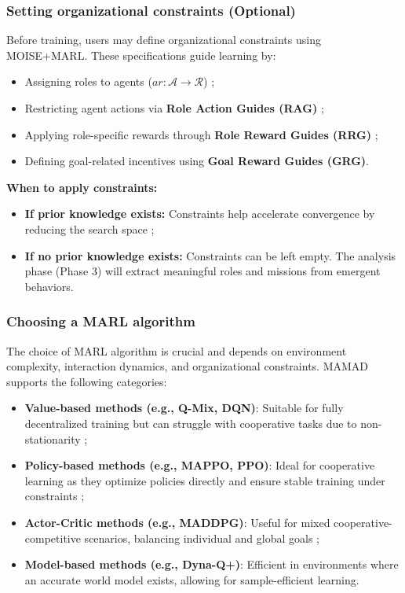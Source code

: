 \documentclass[pdflatex,sn-mathphys-num]{sn-jnl}%
\theoremstyle{thmstyleone}%
\theoremstyle{thmstyletwo}%
\theoremstyle{thmstylethree}%
\begin{document}
\subsubsection{Setting organizational constraints (Optional)}
Before training, users may define organizational constraints using MOISE+MARL. These specifications guide learning by:
\begin{itemize}
    \item Assigning roles to agents ($ar: \mathcal{A} \to \mathcal{R}$) ;
    \item Restricting agent actions via \textbf{Role Action Guides (RAG)} ;
    \item Applying role-specific rewards through \textbf{Role Reward Guides (RRG)} ;
    \item Defining goal-related incentives using \textbf{Goal Reward Guides (GRG)}.
\end{itemize}

\noindent \textbf{When to apply constraints:}
\begin{itemize}
    \item \textbf{If prior knowledge exists:} Constraints help accelerate convergence by reducing the search space ;
    \item \textbf{If no prior knowledge exists:} Constraints can be left empty. The analysis phase (Phase 3) will extract meaningful roles and missions from emergent behaviors.
\end{itemize}

\subsubsection{Choosing a MARL algorithm}
The choice of MARL algorithm is crucial and depends on environment complexity, interaction dynamics, and organizational constraints. MAMAD supports the following categories:

\begin{itemize}
    \item \textbf{Value-based methods (e.g., Q-Mix, DQN)}: Suitable for fully decentralized training but can struggle with cooperative tasks due to non-stationarity ;
    \item \textbf{Policy-based methods (e.g., MAPPO, PPO)}: Ideal for cooperative learning as they optimize policies directly and ensure stable training under constraints ;
    \item \textbf{Actor-Critic methods (e.g., MADDPG)}: Useful for mixed cooperative-competitive scenarios, balancing individual and global goals ;
    \item \textbf{Model-based methods (e.g., Dyna-Q+)}: Efficient in environments where an accurate world model exists, allowing for sample-efficient learning.
\end{itemize}
\end{document}
